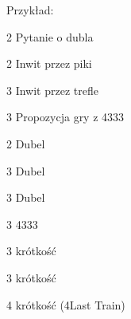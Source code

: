 \documentclass[12pt, a4paper]{article}
\begin{document}
Przykład:
\sequence{{1\clubs}{1\hearts}{2\hearts}}
\begin{options}[2]
    \item[2\spades] Pytanie o dubla \gf
    \item[2\nt] Inwit przez piki
    \item[3\clubs] Inwit przez trefle
    \item[3\nt] Propozycja gry z 4333    
\end{options}

\sequence{{1\clubs}{1\hearts}{2\hearts}{2\spades}}
\begin{options}[1]
    \item[2\nt] Dubel \spades
    \item[3\clubs] Dubel \clubs
    \item[3\diams] Dubel \diams
    \item[3\hearts] 4333
    \item[3\spades] krótkość \spades
    \item[3\nt] krótkość \diams
    \item[4\clubs] krótkość \clubs (4\diams Last Train)
\end{options}
\end{document}
